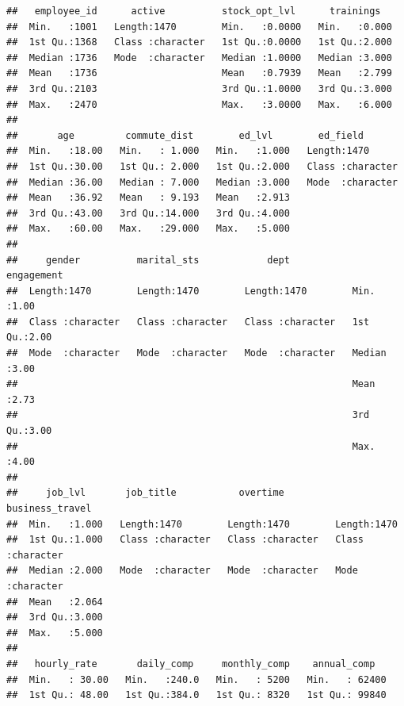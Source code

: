 \documentclass[
]{book}
\begin{document}
\begin{verbatim}
##   employee_id      active          stock_opt_lvl      trainings    
##  Min.   :1001   Length:1470        Min.   :0.0000   Min.   :0.000  
##  1st Qu.:1368   Class :character   1st Qu.:0.0000   1st Qu.:2.000  
##  Median :1736   Mode  :character   Median :1.0000   Median :3.000  
##  Mean   :1736                      Mean   :0.7939   Mean   :2.799  
##  3rd Qu.:2103                      3rd Qu.:1.0000   3rd Qu.:3.000  
##  Max.   :2470                      Max.   :3.0000   Max.   :6.000  
##                                                                    
##       age         commute_dist        ed_lvl        ed_field        
##  Min.   :18.00   Min.   : 1.000   Min.   :1.000   Length:1470       
##  1st Qu.:30.00   1st Qu.: 2.000   1st Qu.:2.000   Class :character  
##  Median :36.00   Median : 7.000   Median :3.000   Mode  :character  
##  Mean   :36.92   Mean   : 9.193   Mean   :2.913                     
##  3rd Qu.:43.00   3rd Qu.:14.000   3rd Qu.:4.000                     
##  Max.   :60.00   Max.   :29.000   Max.   :5.000                     
##                                                                     
##     gender          marital_sts            dept             engagement  
##  Length:1470        Length:1470        Length:1470        Min.   :1.00  
##  Class :character   Class :character   Class :character   1st Qu.:2.00  
##  Mode  :character   Mode  :character   Mode  :character   Median :3.00  
##                                                           Mean   :2.73  
##                                                           3rd Qu.:3.00  
##                                                           Max.   :4.00  
##                                                                         
##     job_lvl       job_title           overtime         business_travel   
##  Min.   :1.000   Length:1470        Length:1470        Length:1470       
##  1st Qu.:1.000   Class :character   Class :character   Class :character  
##  Median :2.000   Mode  :character   Mode  :character   Mode  :character  
##  Mean   :2.064                                                           
##  3rd Qu.:3.000                                                           
##  Max.   :5.000                                                           
##                                                                          
##   hourly_rate       daily_comp     monthly_comp    annual_comp    
##  Min.   : 30.00   Min.   :240.0   Min.   : 5200   Min.   : 62400  
##  1st Qu.: 48.00   1st Qu.:384.0   1st Qu.: 8320   1st Qu.: 99840  

\end{verbatim}
\end{document}
